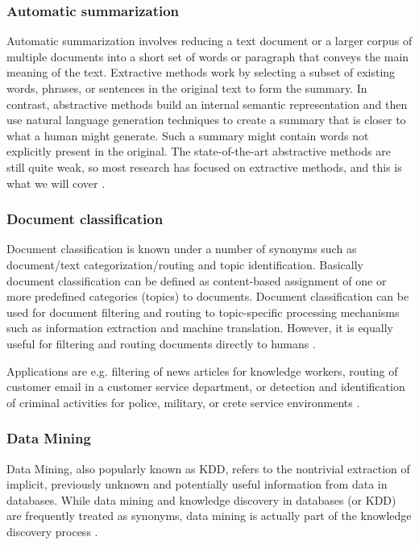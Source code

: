 \subsubsection{Automatic summarization}
Automatic summarization involves reducing a text document or a larger corpus of multiple documents into a short set of words or paragraph that conveys the main meaning of the text. Extractive methods work by selecting a subset of existing words, phrases, or sentences in the original text to form the summary. In contrast, abstractive methods build an internal semantic representation and then use natural language generation techniques to create a summary that is closer to what a human might generate. Such a summary might contain words not explicitly present in the original. The state-of-the-art abstractive methods are still quite weak, so most research has focused on extractive methods, and this is what we will cover \cite{Goldberg:2007}.

\subsubsection{Document classification}
Document classification is known under a number of synonyms such as document/text categorization/routing and topic identification. Basically document classification can be defined as content-based assignment of one or more predefined categories (topics) to documents. Document classification can be used for document filtering and routing to topic-specific processing mechanisms such as information extraction and machine translation. However, it is equally useful for filtering and routing documents directly to humans \cite{Knorz:2000}.

Applications are e.g. filtering of news articles for knowledge workers, routing of customer email in a customer service department, or detection and identification of criminal activities for police, military, or crete service environments \cite{Knorz:2000}.

\subsubsection{Data Mining}
Data Mining, also popularly known as \gls{KDD}, refers to the nontrivial extraction of implicit, previously unknown and potentially useful information from data in databases. While data mining and knowledge discovery in databases (or KDD) are frequently treated as synonyms, data mining is actually part of the knowledge discovery process \cite{Zaiane:1999}. 

